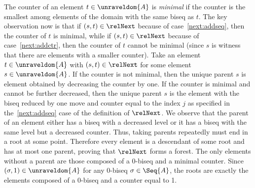\begin{proofsketch}
  The counter of an element $t \in \unraveldom{A}$ is \emph{minimal} if the counter is the smallest among elements of the domain with the same biseq as $t$.
  The key observation now is that if $(s,t) \in \relNext$ because of case~\ref{next:addseq}, then the counter of $t$ is minimal, while if $(s,t) \in \relNext$ because of case~\ref{next:addctr}, then the counter of $t$ cannot be minimal (since $s$ is witness that there are elements with a smaller counter).
  Take an element $t \in \unraveldom{A}$ with $(s, t) \in \relNext$ for some element $s \in \unraveldom{A}$.
  If the counter is not minimal, then the unique parent $s$ is element obtained by decreasing the counter by one.
  If the counter is minimal and cannot be further decreased, then the unique parent $s$ is the element with the biseq reduced by one move and counter equal to the index $j$ as specified in the~\ref{next:addseq} case of the definition of $\relNext$.
  We observe that the parent of an element either has a biseq with a decreased level or it has a biseq with the same level but a decreased counter.
  Thus, taking parents repeatedly must end in a root at some point.
  Therefore every element is a descendant of some root and has at most one parent, proving that $\relNext$ forms a forest.
  The only elements without a parent are those composed of a 0-biseq and a minimal counter.
  Since $(\sigma, 1) \in \unraveldom{A}$ for any 0-biseq $\sigma \in \Seq{A}$, the roots are exactly the elements composed of a 0-biseq and a counter equal to 1.
\end{proofsketch}

